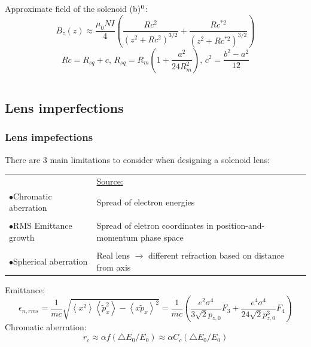 \documentclass[10pt]{beamer}
\newcommand{\citesame}{$^{\thefootnote}$}
\newcommand{\bull}{$\bullet$}
\newcommand{\rfn}{\setcounter{footnote}{0}}
\begin{document}
\begin{frame}
\begin{tiny}
\begin{columns}
\begin{column}{0.6\textwidth}
      Approximate field of the solenoid (b)\citesame:
      \begin{equation}
        B_{z}\left(z\right)\approx\frac{\mu_{0}NI}{4}\left(\frac{Rc^{2}}{\left(z^{2}+Rc^{2}\right)^{3/2}}+\frac{Rc^{*2}}{\left(z^{2}+Rc^{*2}\right)^{3/2}}\right)
      \end{equation}
      \begin{equation}
        Rc=R_{sq}+c,\,R_{sq}=R_{m}\left(1+\frac{a^{2}}{24R_{m}^{2}}\right),\,c^{2}=\frac{b^{2}-a^{2}}{12}
      \end{equation}
    \end{column}
  \end{columns}
  \end{tiny}
\end{frame}

\subsection{Lens imperfections}

\begin{frame}
  \frametitle{Lens impefections}
  \rfn
  \begin{small}
  There are 3 main limitations to consider when designing a solenoid lens:
  \begin{table}[t]
    \centering
    \begin{tabular}{   m{5cm}  m{5cm}  }
      &  \underline{Source:}\vspace{0.2cm} \\
      \bull Chromatic aberration & Spread of electron energies  \\
      & \\
      \bull RMS Emittance growth  &   Spread of eletron coordinates in position-and-momentum phase space \\
      & \\
      \bull Spherical aberration &  Real lens $\rightarrow$ different refraction based on distance from axis \\
    \end{tabular}
  \end{table}
  \end{small}
  \vspace{1cm}
  \begin{tiny}
  Emittance:
  \begin{equation}
    \epsilon_{n,rms}=\frac{1}{mc}\sqrt{\left\langle x^{2}\right\rangle \left\langle \tilde{p}_{x}^{2}\right\rangle -\left\langle x\tilde{p}_{x}\right\rangle ^{2}}=\frac{1}{mc}\left(\frac{e^{2}\sigma^{4}}{3\sqrt{2}p_{z,0}}F_{3}+\frac{e^{4}\sigma^{4}}{24\sqrt{2}p_{z,0}^{3}}F_{4}\right)
  \end{equation}
  Chromatic aberration:
  \begin{equation}
    r_{c}\approx\alpha f\left(\triangle E_{0}/E_{0}\right)\approx\alpha C_{c}\left(\triangle E_{0}/E_{0}\right)
  \end{equation}
  \end{tiny}
\end{frame}
\end{document}
